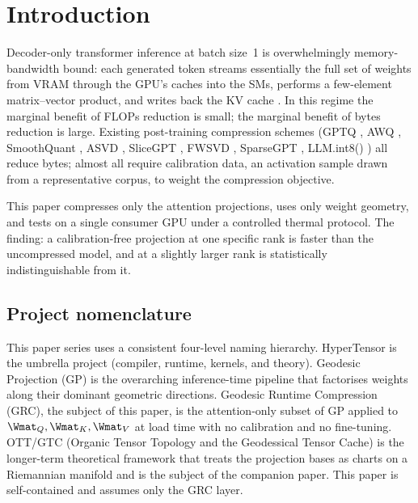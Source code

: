 \documentclass[11pt]{article}
\begin{document}
\section{Introduction}
\label{sec:intro}
Decoder-only transformer inference at batch size~1 is overwhelmingly
memory-bandwidth bound: each generated token streams essentially the
full set of weights from VRAM through the GPU's caches into the SMs, performs
a few-element matrix--vector product, and writes back the KV cache
\cite{williams2009roofline,yuan2024llmroofline}.  In this regime the marginal
benefit of FLOPs reduction is small; the marginal benefit of bytes
reduction is large.  Existing post-training compression schemes
(GPTQ \cite{frantar2022gptq}, AWQ \cite{lin2023awq}, SmoothQuant
\cite{xiao2022smoothquant}, ASVD \cite{yuan2023asvd},
SliceGPT \cite{ashkboos2024slicegpt}, FWSVD \cite{hsu2022fwsvd},
SparseGPT \cite{frantar2023sparsegpt}, LLM.int8() \cite{dettmers2022llmint8})
all reduce bytes; almost all require calibration data, an activation
sample drawn from a representative corpus, to weight the compression
objective.

This paper compresses only the attention projections, uses only weight geometry, and tests on a single consumer GPU under a controlled thermal
protocol. The finding: a calibration-free projection at one specific
rank is faster than the uncompressed model, and at a slightly larger rank
is statistically indistinguishable from it.

\subsection{Project nomenclature}
\label{sec:nomenclature}
This paper series uses a consistent four-level naming hierarchy.
HyperTensor is the umbrella project (compiler, runtime, kernels,
and theory). Geodesic Projection (GP) is the overarching
inference-time pipeline that factorises weights along their dominant
geometric directions. Geodesic Runtime Compression (GRC), the
subject of this paper, is the attention-only subset of GP applied to
$\Wmat_Q,\Wmat_K,\Wmat_V$ at load time with no calibration and no
fine-tuning. OTT/GTC (Organic Tensor Topology and the Geodessical
Tensor Cache) is the longer-term theoretical framework that treats the
projection bases as charts on a Riemannian manifold and is the subject of
the companion paper. This paper is self-contained and assumes only the GRC
layer.
\end{document}
